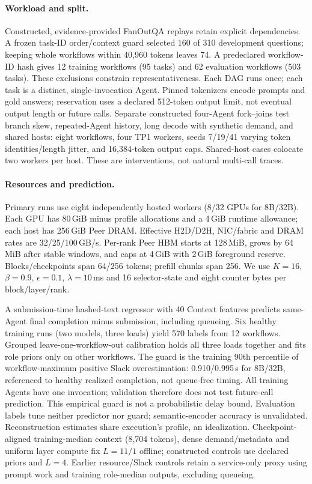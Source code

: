 \paragraph{Workload and split.}
Constructed, evidence-provided FanOutQA replays\cite{eval2024fanoutqa} retain
explicit dependencies. A frozen task-ID order/context guard selected 160 of
310 development questions; keeping whole workflows within 40,960 tokens leaves
74. A predeclared workflow-ID hash gives 12 training workflows (95 tasks) and
62 evaluation workflows (503 tasks). These exclusions constrain
representativeness. Each DAG runs once; each task is a distinct,
single-invocation Agent. Pinned tokenizers encode prompts and gold answers;
reservation uses a declared 512-token output limit, not eventual output length
or future calls.
Separate constructed four-Agent fork--joins test branch skew, repeated-Agent
history, long decode with synthetic demand, and shared hosts: eight workflows,
four TP1 workers, seeds 7/19/41 varying token identities/length jitter, and
16,384-token output caps. Shared-host cases colocate two workers per host.
These are interventions, not natural multi-call traces.

\paragraph{Resources and prediction.}
Primary runs use eight independently hosted workers (8/32 GPUs for 8B/32B).
Each GPU has 80\,GiB minus profile allocations and a 4\,GiB runtime allowance;
each host has 256\,GiB Peer DRAM. Effective H2D/D2H, NIC/fabric and DRAM rates
are 32/25/100\,GB/s. Per-rank Peer HBM starts at 128\,MiB, grows by 64\,MiB
after stable windows, and caps at 4\,GiB with 2\,GiB foreground reserve.
Blocks/checkpoints span 64/256 tokens; prefill chunks span 256.
We use $K=16$, $\beta=0.9$, $\epsilon=0.1$, $\lambda=10$\,ms and
16 selector-state and eight counter bytes per block/layer/rank.

A submission-time hashed-text regressor with 40 Context features predicts
same-Agent final completion minus submission, including queueing. Six healthy
training runs (two models, three loads) yield 570 labels from 12 workflows.
Grouped leave-one-workflow-out calibration holds all three loads together and
fits role priors only on other workflows. The guard is the training 90th
percentile of workflow-maximum positive Slack overestimation: 0.910/0.995\,s
for 8B/32B, referenced to healthy realized completion, not queue-free timing.
All training Agents have one invocation; validation therefore does not test
future-call prediction. This empirical guard is not a probabilistic delay bound.
Evaluation labels tune neither predictor nor guard; semantic-encoder accuracy
is unvalidated. Reconstruction estimates share execution's profile, an idealization.
Checkpoint-aligned training-median context (8,704 tokens), dense demand/metadata and uniform
layer compute fix $L=11/1$ offline; constructed controls use declared priors
and $L=4$. Earlier resource/Slack controls retain a service-only proxy using
prompt work and training role-median outputs, excluding queueing.

